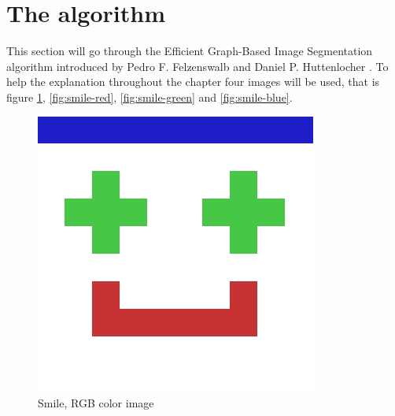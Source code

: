 \section{The algorithm}
This section will go through the Efficient Graph-Based Image Segmentation
algorithm introduced by Pedro F. Felzenswalb and Daniel P. Huttenlocher \cite{felzenswalb2004}.
To help the explanation throughout the chapter four images will be used, that is figure \ref{fig:smile-rgb},
\ref{fig:smile-red}, \ref{fig:smile-green} and \ref{fig:smile-blue}.

\begin{figure}[ht]
    \begin{minipage}[t]{0.45\linewidth}
        \centering
        \includegraphics[width=\textwidth]{images/smile/smile-original.jpg}
        \caption{Smile, RGB color image}
        \label{fig:smile-rgb}
    \end{minipage}
    \hspace{0.5cm}
    \begin{minipage}[t]{0.45\linewidth}
        \centering

\end{minipage}
\end{figure}
